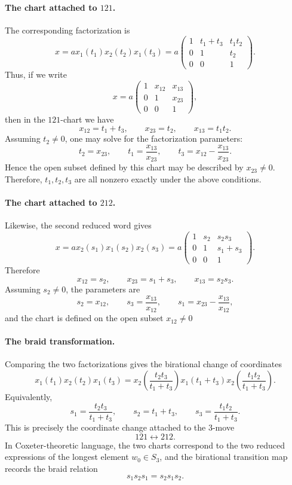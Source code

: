 \documentclass[12pt]{amsart}
\theoremstyle{plain}
\theoremstyle{definition}
\theoremstyle{remark}
\begin{document}
\paragraph{{\bf The chart attached to $121$.}}
The corresponding factorization is
\[
x=a x_1(t_1)x_2(t_2)x_1(t_3)=a
\begin{pmatrix}
1&t_1+t_3&t_1t_2\\
0&1&t_2\\
0&0&1
\end{pmatrix}.
\]
Thus, if we write
\[
x=a
\begin{pmatrix}
1&x_{12}&x_{13}\\
0&1&x_{23}\\
0&0&1
\end{pmatrix},
\]
then in the $121$-chart we have
\[
x_{12}=t_1+t_3,\qquad
x_{23}=t_2,\qquad
x_{13}=t_1t_2.
\]
Assuming $t_2\neq 0$, one may solve for the factorization parameters:
\[
t_2=x_{23},\qquad
t_1=\frac{x_{13}}{x_{23}},\qquad
t_3=x_{12}-\frac{x_{13}}{x_{23}}.
\]
Hence the open subset defined by this chart may be described by $x_{23}\neq 0$. Therefore, $t_1,t_2,t_3$ are all nonzero exactly under the above conditions.

\bigskip

\paragraph{{\bf The chart attached to $212$.}}
Likewise, the second reduced word gives
\[
x=a x_2(s_1)x_1(s_2)x_2(s_3)=a
\begin{pmatrix}
1&s_2&s_2s_3\\
0&1&s_1+s_3\\
0&0&1
\end{pmatrix}.
\]
Therefore
\[
x_{12}=s_2,\qquad
x_{23}=s_1+s_3,\qquad
x_{13}=s_2s_3.
\]
Assuming $s_2\neq 0$, the parameters are
\[
s_2=x_{12},\qquad
s_3=\frac{x_{13}}{x_{12}},\qquad
s_1=x_{23}-\frac{x_{13}}{x_{12}},
\]
and the chart is defined on the open subset $x_{12}\neq 0$

\paragraph{\bf The braid transformation.}
Comparing the two factorizations gives the birational change of coordinates
\[
x_1(t_1)x_2(t_2)x_1(t_3)
=
x_2\!\left(\frac{t_2t_3}{t_1+t_3}\right)
x_1(t_1+t_3)
x_2\!\left(\frac{t_1t_2}{t_1+t_3}\right).
\]
Equivalently,
\[
s_1=\frac{t_2t_3}{t_1+t_3},\qquad
s_2=t_1+t_3,\qquad
s_3=\frac{t_1t_2}{t_1+t_3}.
\]
This is precisely the coordinate change attached to the $3$-move
\[
121\longleftrightarrow 212.
\]
In Coxeter-theoretic language, the two charts correspond to the two reduced expressions of the longest element $w_0\in S_3$, and the birational transition map records the braid relation
\[
s_1s_2s_1=s_2s_1s_2.
\]
\end{document}
